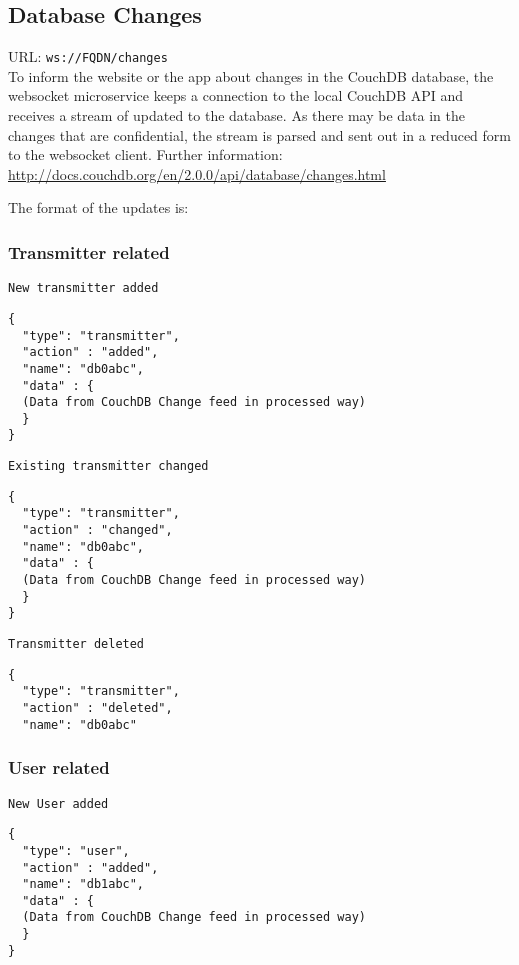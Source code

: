 \subsection{Database Changes}
\label{protcoldef:websocketapi:databasechanges}
URL: \texttt{ws://FQDN/changes}\\

To inform the website or the app about changes in the CouchDB database, the
websocket microservice keeps a connection to the local CouchDB API and receives
a stream of updated to the database. As there may be data in the changes that
are confidential, the stream is parsed and sent out in a reduced form to the
websocket client. Further information:
\url{http://docs.couchdb.org/en/2.0.0/api/database/changes.html}

The format of the updates is:


\subsubsection{Transmitter related}
\texttt{New transmitter added}

\begin{lstlisting}
{
  "type": "transmitter",
  "action" : "added",
  "name": "db0abc",
  "data" : {
  (Data from CouchDB Change feed in processed way)
  }
}
\end{lstlisting}

\texttt{Existing transmitter changed}
\begin{lstlisting}
{
  "type": "transmitter",
  "action" : "changed",
  "name": "db0abc",
  "data" : {
  (Data from CouchDB Change feed in processed way)
  }
}
\end{lstlisting}

\texttt{Transmitter deleted}
\begin{lstlisting}
{
  "type": "transmitter",
  "action" : "deleted",
  "name": "db0abc"
\end{lstlisting}

\subsubsection{User related}
\texttt{New User added}
\begin{lstlisting}
{
  "type": "user",
  "action" : "added",
  "name": "db1abc",
  "data" : {
  (Data from CouchDB Change feed in processed way)
  }
}
\end{lstlisting}

